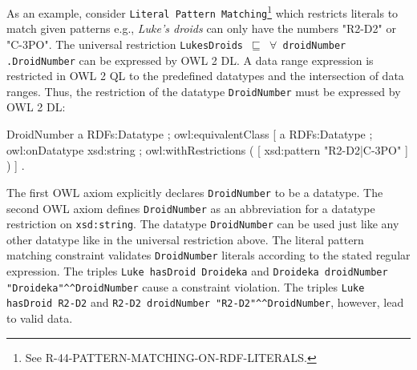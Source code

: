 \documentclass{llncs}
\newcommand{\ms}[1]{\texttt{#1}}
\newcommand{\tb}[1]{\todo[size=\small, color=green!40]{\textbf{Thomas:} #1}}
\newcommand{\er}[1]{\todo[size=\small, color=red!40]{\textbf{Erman:} #1}}
\begin{document}
As an example, consider \ms{Literal Pattern Matching}\footnote{See R-44-PATTERN-MATCHING-ON-RDF-LITERALS.} which  restricts literals to match given patterns e.g., 
\emph{Luke's droids} can only have the numbers "R2-D2" or "C-3PO".
The universal restriction \ms{LukesDroids $\sqsubseteq$ $\forall$ droidNumber} \\ \ms{.DroidNumber} can be expressed by OWL 2 DL.
A data range expression is restricted in OWL 2 QL to the predefined datatypes and the intersection of data ranges. 
Thus, the restriction of the datatype \ms{DroidNumber} must be expressed by OWL 2 DL: %

\begin{ex}
DroidNumber 
    a RDFs:Datatype ;
    owl:equivalentClass [
        a RDFs:Datatype ;
        owl:onDatatype xsd:string ;
        owl:withRestrictions ( 
            [ xsd:pattern "R2-D2|C-3PO" ] ) ] .
\end{ex}

The first OWL axiom explicitly declares \ms{DroidNumber} to be a datatype. %
The second OWL axiom defines \ms{DroidNumber} as an abbreviation for a datatype restriction on \ms{xsd:string}. 
The datatype \ms{DroidNumber} can be used just like any other datatype like in the universal restriction above.
The literal pattern matching constraint validates \ms{DroidNumber} literals according to the stated regular expression. 
The triples \ms{Luke hasDroid Droideka} and \ms{Droideka droidNumber "Droideka"\textasciicircum{}\textasciicircum{}DroidNumber} cause a constraint violation. 
The triples \ms{Luke hasDroid R2-D2} and \ms{R2-D2 droidNumber "R2-D2"\textasciicircum{}\textasciicircum{}DroidNumber}, however, lead to valid data. %
\end{document}
